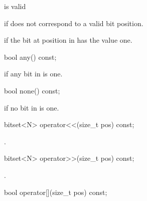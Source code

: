 \begin{itemdescr}
\pnum
\requires
{} is valid

\pnum
\throws
{}
if  does not correspond to a valid bit position.%

\pnum
\returns
{}
if the bit at position 
in
has the value one.
\end{itemdescr}

%
\begin{itemdecl}
bool any() const;
\end{itemdecl}

\begin{itemdescr}
\pnum
\returns
{}
if any bit in
is one.
\end{itemdescr}

%
\begin{itemdecl}
bool none() const;
\end{itemdecl}

\begin{itemdescr}
\pnum
\returns
{}
if no bit in
is one.
\end{itemdescr}

%
\begin{itemdecl}
bitset<N> operator<<(size_t pos) const;
\end{itemdecl}

\begin{itemdescr}
\pnum
\returns
{}.
\end{itemdescr}

%
\begin{itemdecl}
bitset<N> operator>>(size_t pos) const;
\end{itemdecl}

\begin{itemdescr}
\pnum
\returns
{}.
\end{itemdescr}

\begin{itemdecl}
bool operator[](size_t pos) const;
\end{itemdecl}


